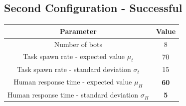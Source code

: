 \documentclass[10pt,a4paper]{article}
\begin{document}
		\subsection{Second Configuration - Successful}
			\begin{center}
				\begin{tabular}{ |c|c|}
					\hline
					Parameter & Value\\
					\hline
					\hline
					Number of bots & 8 \\
					\hline
					Task spawn rate - expected value $\mu_t$ & 70\\
					\hline					
					Task spawn rate - standard deviation $\sigma_t$ & 15\\
					\hline
					Human response time - expected value $\mu_H$ & \textbf{60}\footnotemark\\
					\hline					
					Human response time - standard deviation $\sigma_H$ & \textbf{5}\\
					\hline
				\end{tabular}
			\end{center}
			
\end{document}
